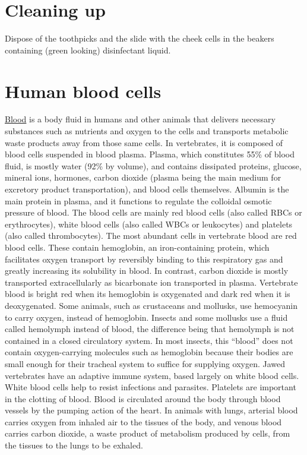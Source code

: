 \section{Cleaning up}\label{cleaning-up-4}

Dispose of the toothpicks and the slide with the cheek cells in the
beakers containing (green looking) disinfectant liquid.

\section{Human blood cells}\label{human-blood-cells}

\href{https://en.wikipedia.org/wiki/Blood}{Blood} is a body fluid in
humans and other animals that delivers necessary substances such as
nutrients and oxygen to the cells and transports metabolic waste
products away from those same cells. In vertebrates, it is composed of
blood cells suspended in blood plasma. Plasma, which constitutes 55\% of
blood fluid, is mostly water (92\% by volume), and contains dissipated
proteins, glucose, mineral ions, hormones, carbon dioxide (plasma being
the main medium for excretory product transportation), and blood cells
themselves. Albumin is the main protein in plasma, and it functions to
regulate the colloidal osmotic pressure of blood. The blood cells are
mainly red blood cells (also called RBCs or erythrocytes), white blood
cells (also called WBCs or leukocytes) and platelets (also called
thrombocytes). The most abundant cells in vertebrate blood are red blood
cells. These contain hemoglobin, an iron-containing protein, which
facilitates oxygen transport by reversibly binding to this respiratory
gas and greatly increasing its solubility in blood. In contrast, carbon
dioxide is mostly transported extracellularly as bicarbonate ion
transported in plasma. Vertebrate blood is bright red when its
hemoglobin is oxygenated and dark red when it is deoxygenated. Some
animals, such as crustaceans and mollusks, use hemocyanin to carry
oxygen, instead of hemoglobin. Insects and some mollusks use a fluid
called hemolymph instead of blood, the difference being that hemolymph
is not contained in a closed circulatory system. In most insects, this
``blood'' does not contain oxygen-carrying molecules such as hemoglobin
because their bodies are small enough for their tracheal system to
suffice for supplying oxygen. Jawed vertebrates have an adaptive immune
system, based largely on white blood cells. White blood cells help to
resist infections and parasites. Platelets are important in the clotting
of blood. Blood is circulated around the body through blood vessels by
the pumping action of the heart. In animals with lungs, arterial blood
carries oxygen from inhaled air to the tissues of the body, and venous
blood carries carbon dioxide, a waste product of metabolism produced by
cells, from the tissues to the lungs to be exhaled.

